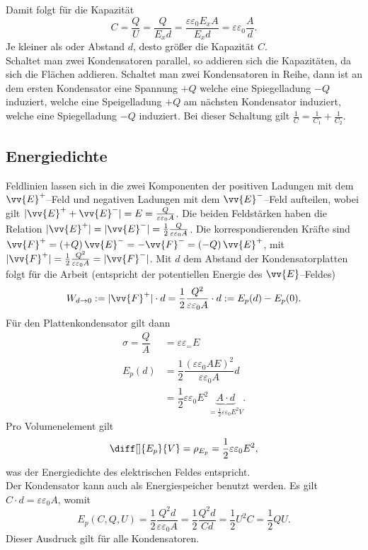 \documentclass[a4paper,12pt]{article}
\begin{document}
Damit folgt für die Kapazität
\[ 
        C=\dfrac{Q}{U}=\dfrac{Q}{E_xd}=\dfrac{\varepsilon \varepsilon _0E_xA}{E_xd}=\varepsilon \varepsilon _0\dfrac{A}{d}
.\] 
Je kleiner als oder Abstand $d$, desto größer die Kapazität $C$.\\\indent
Schaltet man zwei Kondensatoren parallel, so addieren sich die Kapazitäten, da sich die Flächen addieren. Schaltet man zwei Kondensatoren in Reihe, dann ist an dem ersten Kondensator eine Spannung $+Q$ welche eine Spiegelladung $-Q$ induziert, welche eine Speigelladung $+Q$ am nächsten Kondensator induziert, welche eine Spiegelladung $-Q$ induziert. Bei dieser Schaltung gilt $\tfrac{1}{C}=\tfrac{1}{C_1}+\tfrac{1}{C_2}$.

\subsection{Energiedichte}
Feldlinien lassen sich in die zwei Komponenten der positiven Ladungen mit dem $\vv{E}^+$--Feld und negativen Ladungen mit dem $\vv{E}^-$--Feld aufteilen, wobei gilt $|\vv{E}^++\vv{E}^-|=E=\tfrac{Q}{\varepsilon \varepsilon _0A}$. Die beiden Feldstärken haben die Relation $|\vv{E}^+|=|\vv{E}^-|=\tfrac{1}{2}\tfrac{Q}{\varepsilon \varepsilon _0A}$. Die korrespondierenden Kräfte sind $\vv{F}^+=\left(+Q\right)\vv{E}^-=-\vv{F}^-=\left(-Q\right)\vv{E}^+$, mit $|\vv{F}^+|=\tfrac{1}{2}\tfrac{Q^2}{\varepsilon \varepsilon _0A}=|\vv{F}^-|$. Mit $d$ dem Abstand der Kondensatorplatten folgt für die Arbeit (entspricht der potentiellen Energie des $\vv{E}$--Feldes)
\[ 
        W_{d\rightarrow 0}:=|\vv{F}^+|\cdot d=\dfrac{1}{2}\dfrac{Q^2}{\varepsilon \varepsilon _0A}\cdot d:=E_p(d)-E_p(0)
.\] 
Für den Plattenkondensator gilt dann
\begin{align*}
        \sigma =\dfrac{Q}{A}&=\varepsilon \varepsilon _=E\\
        E_p\left(d\right)&=\dfrac{1}{2}\dfrac{\left(\varepsilon \varepsilon _0AE\right)^2}{\varepsilon \varepsilon _0A}d\\
                         &=\dfrac{1}{2}\varepsilon \varepsilon _0E^2\underbrace{A\cdot d}_{=\tfrac{1}{2}\varepsilon \varepsilon _0E^2V}
.\end{align*}
Pro Volumenelement gilt
\[ 
        \diff[]{E_p}{V}=\rho _{E_p}=\dfrac{1}{2}\varepsilon \varepsilon _0E^2
,\] 
was der Energiedichte des elektrischen Feldes entspricht.\\\indent
Der Kondensator kann auch als Energiespeicher benutzt werden. Es gilt $C\cdot d=\varepsilon \varepsilon _0A$, womit
\[ 
        E_p\left(C,Q,U\right)=\dfrac{1}{2}\dfrac{Q^2d}{\varepsilon \varepsilon _0A}=\dfrac{1}{2}\dfrac{Q^2d}{Cd}=\dfrac{1}{2}U^2C=\dfrac{1}{2}QU
.\] 
Dieser Ausdruck gilt für alle Kondensatoren.
\end{document}
